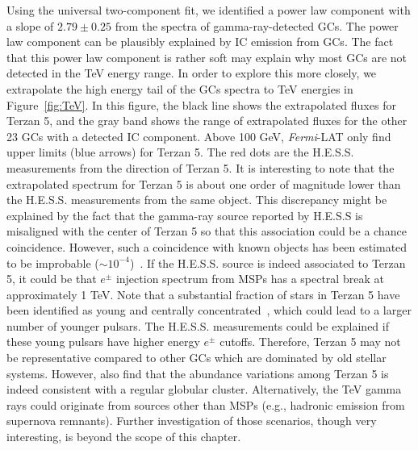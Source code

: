 \documentclass[doublespace,nopageskip]{VTthesis} %
\begin{document}
Using the universal two-component fit, we identified a power law component with a slope of $2.79 \pm  0.25$ from the spectra of gamma-ray-detected GCs. The power law component can be plausibly explained by IC emission from GCs. The fact that this power law component is rather soft may explain why most GCs are not detected in the TeV energy range. In order to explore this more closely, we extrapolate the high energy tail of the GCs spectra to TeV energies in Figure~\ref{fig:TeV}. In this figure, the black line shows the extrapolated fluxes for Terzan 5, and the gray band shows the range of extrapolated fluxes for the other 23 GCs with a detected IC component. Above 100 GeV, {\it Fermi}-LAT only find upper limits (blue arrows) for Terzan 5. The red dots are the H.E.S.S. measurements from the direction of Terzan 5. It is interesting to note that the extrapolated spectrum for Terzan 5 is about one order of magnitude lower than the H.E.S.S. measurements from the same object. This discrepancy might be explained by the fact that the gamma-ray source reported by H.E.S.S is misaligned with the center of Terzan 5 so that this association could be a chance coincidence. However, such a coincidence with known objects has been estimated to be improbable ($\sim 10^{-4}$)~\citep{2011A&A...531L..18H}. If the H.E.S.S. source is indeed associated to Terzan 5, it could be that $e^\pm$ injection spectrum from MSPs has a spectral break at approximately 1 TeV. Note that a substantial fraction of stars in Terzan 5 have been identified as young and centrally concentrated~\citep{2016ApJ...828...75F,2020BAAA..61R...90G}, which could lead to a larger number of younger pulsars. The H.E.S.S. measurements could be explained if these young pulsars have higher energy $e^\pm$ cutoffs. Therefore, Terzan 5 may not be representative compared to other GCs which are dominated by old stellar systems. However, \citet{2019AJ....158...14N} also find that the abundance variations among Terzan 5 is indeed consistent with a regular globular cluster. Alternatively, the TeV gamma rays could originate from sources other than MSPs (e.g., hadronic emission from supernova remnants). Further investigation of those scenarios, though very interesting, is beyond the scope of this chapter. 
\end{document}
